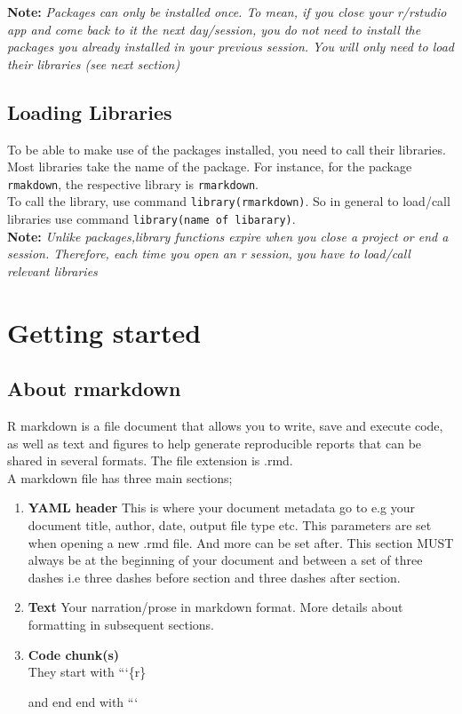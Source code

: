 \documentclass[
]{book}
\begin{document}
\textbf{Note:} \emph{Packages can only be installed once. To mean, if you close your r/rstudio app and come back to it the next day/session, you do not need to install the packages you already installed in your previous session. You will only need to load their libraries (see next section)}

\hypertarget{loading-libraries}{%
\section{Loading Libraries}\label{loading-libraries}}

To be able to make use of the packages installed, you need to call their libraries. Most libraries take the name of the package. For instance, for the package \texttt{rmakdown}, the respective library is \texttt{rmarkdown}.\\
To call the library, use command \texttt{library(rmarkdown)}.
So in general to load/call libraries use command \texttt{library(name\ of\ libarary)}.\\
\textbf{Note:} \emph{Unlike packages,library functions expire when you close a project or end a session. Therefore, each time you open an r session, you have to load/call relevant libraries}

\hypertarget{getting-started}{%
\chapter{Getting started}\label{getting-started}}

\hypertarget{about-rmarkdown}{%
\section{About rmarkdown}\label{about-rmarkdown}}

R markdown is a file document that allows you to write, save and execute code, as well as text and figures to help generate reproducible reports that can be shared in several formats.
The file extension is .rmd.\\
A markdown file has three main sections;

\begin{enumerate}
\def\labelenumi{\arabic{enumi}.}
\item
  \textbf{YAML header}
  This is where your document metadata go to e.g your document title, author, date, output file type etc.
  This parameters are set when opening a new .rmd file. And more can be set after.
  This section MUST always be at the beginning of your document and between a set of three dashes i.e three dashes before section and three dashes after section.
\item
  \textbf{Text}
  Your narration/prose in markdown format. More details about formatting in subsequent sections.
\item
  \textbf{Code chunk(s)}\\
  They start with ```\{r\}

  and end end with ```
\end{enumerate}
\end{document}
